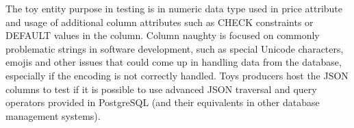 The toy entity purpose in testing is in numeric data type used in price
attribute and usage of additional column attributes such as CHECK constraints or
DEFAULT values in the column. Column naughty is focused on commonly problematic
strings in software development, such as special Unicode characters, emojis and
other issues that could come up in handling data from the database, especially
if the encoding is not correctly handled. Toys producers host the JSON columns
to test if it is possible to use advanced JSON traversal and query operators
provided in PostgreSQL (and their equivalents in other database management
systems).
